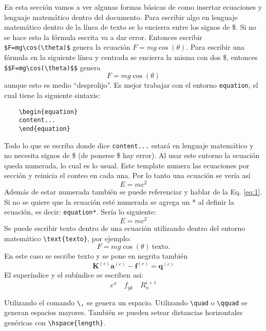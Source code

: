 \documentclass[a4paper,12pt]{article} %
\begin{document}
	En esta sección vamos a ver algunas formas básicas de como insertar ecuaciones y lenguaje matemático dentro del documento. Para escribir algo en lenguaje matemático dentro de la línea de texto se lo encierra entre los signos de \$. Si no se hace esto la fórmula escrita va a dar error. Entonces escribir \verb|$F=mg\cos(\theta)$| genera la ecuación $F=mg\cos(\theta)$. Para escribir una fórmula en la siguiente línea y centrada se encierra la misma con dos \$, entonces \verb|$$F=mg\cos(\theta)$$| genera
	$$F=mg\cos(\theta)$$
	aunque esto es medio ``desprolijo''. Es mejor trabajar con el entorno \verb|equation|, el cual tiene la siguiente sintaxis:
	\begin{verbatim}
	\begin{equation}
	content...
	\end{equation}
	\end{verbatim}
	Todo lo que se escriba donde dice \verb|content...| estará en lenguaje matemático y no necesita signos de \$ (de ponerse \$ hay error). Al usar este entorno la ecuación queda numerada, lo cual es lo usual. Este template numera las ecuaciones por sección y reinicia el conteo en cada una. Por lo tanto una ecuación se vería así
	\begin{equation}\label{eq:1}
	E=mc^2
	\end{equation}
	Además de estar numerada también se puede referenciar y hablar de la Eq. \eqref{eq:1}. Si no se quiere que la ecuación esté numerada se agrega un * al definir la ecuación, es decir: \verb|equation*|. Sería lo siguiente:
	\begin{equation*}
	E=mc^2
	\end{equation*}
	Se puede escribir texto dentro de una ecuación utilizando dentro del entorno matemático \verb|\text{texto}|, por ejemplo:
	\begin{equation}\label{eq:2}
	F=mg\cos(\theta) ~ \text{texto.}
	\end{equation}
	En este caso se escribe texto y se pone en negrita también
	\begin{equation}
	\textbf{K}^{(e)}\textbf{a}^{(e)} - \textbf{f}^{(e)} = \textbf{q}^{(e)}
	\end{equation}
	El superíndice y el subíndice se escriben asi:
	\begin{equation}
	e^{x} \quad f_{yk} \quad R_{n}^{i+1}
	\end{equation}
	
	Utilizando el comando \verb|\,| se genera un espacio. Utilizando \verb|\quad| o \verb|\qquad| se generan espacios mayores. También se pueden setear distancias horizontales genéricas con \verb|\hspace{length}|.\\
	
\end{document}
